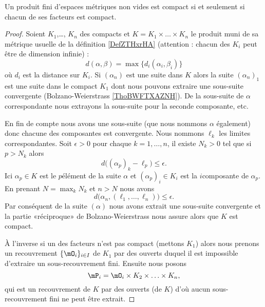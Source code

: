 \begin{theorem}\label{THOIYmxXuu}
    Un produit fini d'espaces métriques non vides est compact si et seulement si chacun de ses facteurs est compact.
\end{theorem}

\begin{proof}
    Soient \( K_1\),\ldots, \( K_n\) des compacts et \( K=K_1\times \ldots\times K_n\) le produit muni de sa métrique usuelle de la définition \eqref{DefZTHxrHA} (attention : chacun des \( K_i\) peut être de dimension infinie) :
    \begin{equation}
        d(\alpha,\beta)=\max\{ d_i(\alpha_i,\beta_i) \}
    \end{equation}
    où \( d_i\) est la distance sur \( K_i\). Si \( (\alpha_n)\) est une suite dans \( K\) alors la suite \( (\alpha_n)_1\) est une suite dans le compact \( K_1\) dont nous pouvons extraire une sous-suite convergente (Bolzano-Weierstrass \ref{ThoBWFTXAZNH}). De la sous-suite de \( \alpha\) correspondante nous extrayons la sous-suite pour la seconde composante, etc.

    En fin de compte nous avons une sous-suite (que nous nommons \( \alpha\) également) donc chacune des composantes est convergente. Nous nommons \( \ell_k\) les limites correspondantes. Soit \( \epsilon>0\) pour chaque \( k=1,\ldots, n\), il existe \( N_k>0\) tel que si \( p>N_k\) alors
    \begin{equation}
        d\big( (\alpha_p)_k-\ell_p \big)\leq \epsilon.
    \end{equation}
    Ici \( \alpha_p\in K\) est le \( p\)\ieme élément de la suite \( \alpha\) et \( (\alpha_p)_i\in K_i\) est la \( i\)\ieme composante de \( \alpha_p\). En prenant \( N=\max_kN_k\) et \( n>N\) nous avons
    \begin{equation}
        d\big( \alpha_n,(\ell_1,\ldots, \ell_n) \big)\leq\epsilon.
    \end{equation}
    Par conséquent de la suite \( (\alpha)\) nous avons extrait une sous-suite convergente et la partie «réciproque» de Bolzano-Weierstrass nous assure alors que \( K\) est compact.

    À l'inverse si un des facteurs n'est pas compact (mettons \( K_1\)) alors nous prenons un recouvrement \( \{ \mO_i \}_{i\in I}\) de \( K_1\) par des ouverts duquel il est impossible d'extraire un sous-recouvrement fini. Ensuite nous posons
    \begin{equation}
        \mP_i=\mO_i\times K_2\times\ldots\times K_n,
    \end{equation}
    qui est un recouvrement de \( K\) par des ouverts (de \( K\)) d'où aucun sous-recouvrement fini ne peut être extrait.
\end{proof}

